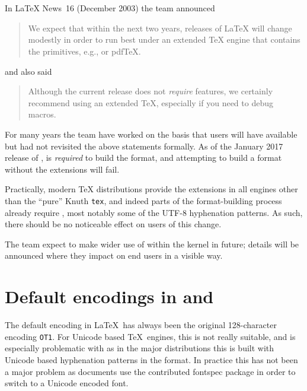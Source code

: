 \documentclass{ltnews}
\begin{document}
\maketitle
\tableofcontents

\setlength{}
\section{\eTeX{}}

In \LaTeX{} News~16 (December 2003) the team announced
\begin{quotation}
We expect that within the next two years, releases of \LaTeX{} will
change modestly in order to run best under an extended \TeX{} engine
that contains the \eTeX{} primitives, e.g., \eTeX{} or pdf\TeX{}.
\end{quotation}
and also said
\begin{quotation}
Although the current release does not \emph{require} \eTeX{} features, we
certainly recommend using an extended \TeX{}, especially if you need to debug
macros.
\end{quotation}

For many years the team have worked on the basis that users will have \eTeX{}
available but had not revisited the above statements formally. As of the
January 2017 release of \LaTeXe{}, \eTeX{} is \emph{required} to build the
format, and attempting to build a format without the extensions will fail.

Practically, modern \TeX{} distributions provide the extensions in all engines
other than the ``pure'' Knuth \texttt{tex}, and indeed parts of the
format-building process already require \eTeX{}, most notably some of the UTF-8
hyphenation patterns. As such, there should be no noticeable effect on users of
this change.

The team expect to make wider use of \eTeX{} within the kernel in future;
details will be announced where they impact on end users in a visible way.

\section{Default encodings in  and }
The default encoding in \LaTeX\ has always been the original
128-character encoding \texttt{OT1}.  For Unicode based \TeX\ engines, this
is not really suitable, and is especially problematic with
 as in the major distributions this is built with
Unicode based hyphenation patterns in the format.  In practice this has
not been a major problem as documents use the contributed
\textsf{fontspec} package in order to switch to a
Unicode encoded font.
\end{document}
